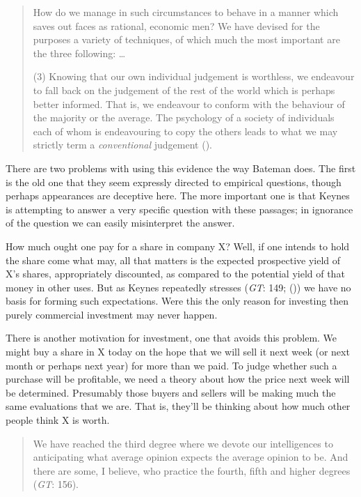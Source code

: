 \documentclass[
  11pt,
  letterpaper,
  DIV=11,
  numbers=noendperiod,
  twoside]{scrartcl}
\begin{document}
\begin{quote}
How do we manage in such circumstances to behave in a manner which saves
out faces as rational, economic men? We have devised for the purposes a
variety of techniques, of which much the most important are the three
following: \ldots{}

(3) Knowing that our own individual judgement is worthless, we endeavour
to fall back on the judgement of the rest of the world which is perhaps
better informed. That is, we endeavour to conform with the behaviour of
the majority or the average. The psychology of a society of individuals
each of whom is endeavouring to copy the others leads to what we may
strictly term a \emph{conventional} judgement
().
\end{quote}

There are two problems with using this evidence the way Bateman does.
The first is the old one that they seem expressly directed to empirical
questions, though perhaps appearances are deceptive here. The more
important one is that Keynes is attempting to answer a very specific
question with these passages; in ignorance of the question we can easily
misinterpret the answer.

How much ought one pay for a share in company X? Well, if one intends to
hold the share come what may, all that matters is the expected
prospective yield of X's shares, appropriately discounted, as compared
to the potential yield of that money in other uses. But as Keynes
repeatedly stresses (\emph{GT}: 149; ()) we have no basis for forming such expectations. Were this
the only reason for investing then purely commercial investment may
never happen.

There is another motivation for investment, one that avoids this
problem. We might buy a share in X today on the hope that we will sell
it next week (or next month or perhaps next year) for more than we paid.
To judge whether such a purchase will be profitable, we need a theory
about how the price next week will be determined. Presumably those
buyers and sellers will be making much the same evaluations that we are.
That is, they'll be thinking about how much other people think X is
worth.

\begin{quote}
We have reached the third degree where we devote our intelligences to
anticipating what average opinion expects the average opinion to be. And
there are some, I believe, who practice the fourth, fifth and higher
degrees (\emph{GT}: 156).
\end{quote}
\end{document}
